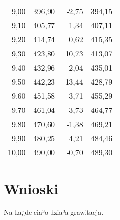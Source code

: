 \documentclass{article}
\begin{document}
\begin{center}
\begin{longtable}{r|r|r|r}
        9,00 & 396,90 & -2,75 & 394,15 \\
        9,10 & 405,77 & 1,34 & 407,11 \\
        9,20 & 414,74 & 0,62 & 415,35 \\
        9,30 & 423,80 & -10,73 & 413,07 \\
        9,40 & 432,96 & 2,04 & 435,01 \\
        9,50 & 442,23 & -13,44 & 428,79 \\
        9,60 & 451,58 & 3,71 & 455,29 \\
        9,70 & 461,04 & 3,73 & 464,77 \\
        9,80 & 470,60 & -1,38 & 469,21 \\
        9,90 & 480,25 & 4,21 & 484,46 \\
        10,00 & 490,00 & -0,70 & 489,30 \\
\end{longtable}
\end{center}



\section{Wnioski}
Na ka¿de cia³o dzia³a grawitacja.
\end{document}
